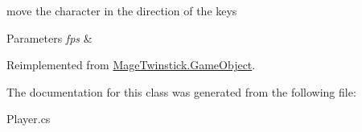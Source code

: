 move the character in the direction of the keys 


\begin{DoxyParams}{Parameters}
{\em fps} & \\
\hline
\end{DoxyParams}


Reimplemented from \hyperlink{class_mage_twinstick_1_1_game_object}{Mage\+Twinstick.\+Game\+Object}.



The documentation for this class was generated from the following file\+:\begin{DoxyCompactItemize}
\item 
Player.\+cs\end{DoxyCompactItemize}
